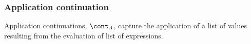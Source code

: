 \documentclass[a4paper,oneside]{article}
\begin{document}
\subsubsection{Application continuation}
\label{subsubsec:application-continuation}

Application continuations, $\acont$, capture the application of a list of values resulting from the evaluation of list of expressions.

\newcommand{\ValueA}[2]{\mathrm{ValueA}({#1},\,{#2})}
\newcommand{\StringConcatenationA}{\mathrm{StringConcatenationA(\econt)}}
\newcommand{\SuperMethodA}{\mathrm{SuperMethodA}(\idmeta,\,\env,\,\ExceptionHandlers,\,\econt)}
\newcommand{\StaticInvA}[4]{\mathrm{StaticInvocationA}({#1},\,{#2},\,{#3},\,\ExceptionHandlersRest,\,{#4})}
\newcommand{\DInstanceMethodA}{\mathrm{DInstanceMethodA}(\membermeta,\,\val,\,\ExceptionHandlers,\,\econt)}
\newcommand{\FieldsA}[4]{\mathrm{FieldsA}({#1},\,{#2},\,{#3},\,\strace,\,\handler,\,\cstrace,\,\cex,\,{#4})}
\newcommand{\SuperA}[3]{\mathrm{SuperA}({#1},\,{#2},\,\strace,\,\handler,\,\cstrace,\,\cex,\,{#3})}
\newcommand{\ConstructorA}[2]{\mathrm{ConstructorA}({#1},\,\strace,\,\handler,\,\cstrace,\,\cex,\,{#2})}
\newcommand{\RedirectingA}[3]{\mathrm{RedirectingA}({#1},\,{#2},\,\strace,\,\handler,\,\cstrace,\,\cex,\,{#3})}
\newcommand{\ForInitA}{\mathrm{ForInitA}(\mathrm{\varmeta{s}},\, \expressionmeta,\, \exprs,\, \statementmeta,\, \env,\, \lbls,\, \clbls,\, \handler,\, \cstrace,\, \cex,\, \econt,\, \scont)}
%
\newcommand{\ForUpdatesA}[1]{\mathrm{ForUpdatesA}(\mathrm{\varmeta{s}},\, \expressionmeta,\, \exprs,\, \statementmeta,\, \env,\, #1,\, \lbls,\, \clbls,\, \handler,\, \cstrace,\, \cex,\, \econt,\, \scont)}
\newcommand{\InstanceMethodA}{\mathrm{InstanceMethodA(\idmeta,\,\val,\,\strace,\,\handler,\,\cstrace,\,\cex,\,\econt)}}
\end{document}
